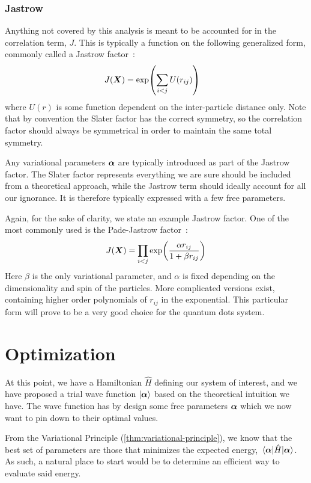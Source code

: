 \documentclass[Thesis.tex]{subfiles}
\begin{document}
\subsubsection*{Jastrow}

Anything not covered by this analysis is meant to be accounted for in the correlation
term, $J$. This is typically a function on the following generalized form, commonly called a Jastrow
factor~\cite{Jastrow-1955}:
\begin{align}
    J(\bm{X}) &= \exp(\sum_{i < j} U(r_{ij}))
\end{align}
where $U(r)$ is some function dependent on the inter-particle distance only. Note that by
convention the Slater factor has the correct symmetry, so the correlation factor should
always be symmetrical in order to maintain the same total symmetry.

Any variational parameters $\bm{\alpha}$ are typically introduced as part of the Jastrow
factor. The Slater factor represents everything we are sure should be included
from a theoretical approach, while the Jastrow term should ideally account for all our ignorance.
It is therefore typically expressed with a few free parameters.

Again, for the sake of clarity, we state an example Jastrow factor. One of the most
commonly used is the Pade-Jastrow factor~\cite{Drummond-Towler-Needs-2008}:
\begin{align}
    J(\bm{X}) = \prod_{i < j} \exp(\frac{\alpha r_{ij}}{1 + \beta r_{ij} } )
\end{align}
Here $\beta$ is the only variational parameter, and $\alpha$ is fixed depending on the
dimensionality and spin of the particles. More complicated versions exist, containing
higher order polynomials of $r_{ij}$ in the exponential. This particular form
will prove to be a very good choice for the quantum dots system.




\section{Optimization}

At this point, we have a Hamiltonian $\hat H$ defining our system of interest,
and we have proposed a trial wave function $| \bm{\alpha} \rangle$ based on the
theoretical intuition we have. The wave function has by design some free
parameters $\bm{\alpha}$ which we now want to pin down to their optimal values.

From the Variational Principle (\cref{thm:variational-principle}), we know
that the best set of parameters are those that minimizes the expected energy,
$\expval{\hat H}{\bm{\alpha}}$. As such, a natural place to start would be to
determine an efficient way to evaluate said energy.
\end{document}

